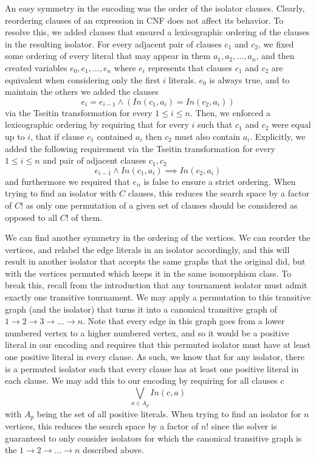 \documentclass[a4paper,UKenglish,cleveref, autoref, thm-restate]{lipics-v2021}
\begin{document}
An easy symmetry in the encoding was the order of the isolator clauses.  Clearly, reordering clauses of an expression in CNF does not affect its behavior.  To resolve this, we added clauses that ensured a lexicographic ordering of the clauses in the resulting isolator.  For every adjacent pair of clauses $c_1$ and $c_2$, we fixed some ordering of every literal that may appear in them $a_1, a_2, \dots, a_n$, and then created variables $e_0, e_1, \dots, e_n$ where $e_i$ represents that clauses $c_1$ and $c_2$ are equivalent when considering only the first $i$ literals.  $e_0$ is always true, and to maintain the others we added the clauses
$$e_i = e_{i-1} \land (In(c_1, a_i) = In(c_2, a_i))$$
via the Tseitin transformation for every $1 \le i \le n$.  Then, we enforced a lexicographic ordering by requiring that for every $i$ such that $c_1$ and $c_2$ were equal up to $i$, that if clause $c_1$ contained $a_i$ then $c_2$ must also contain $a_i$.  Explicitly, we added the following requirement via the Tseitin transformation for every $1 \le i \le n$ and pair of adjacent clauses $c_1, c_2$
$$e_{i-1} \land In(c_1, a_i) \implies In(c_2, a_i)$$
and furthermore we required that $e_n$ is false to ensure a strict ordering.  When trying to find an isolator with $C$ clauses, this reduces the search space by a factor of $C!$ as only one permutation of a given set of clauses should be considered as opposed to all $C!$ of them.

We can find another symmetry in the ordering of the vertices.  We can reorder the vertices, and relabel the edge literals in an isolator accordingly, and this will result in another isolator that accepts the same graphs that the original did, but with the vertices permuted which keeps it in the same isomorphism class.  To break this, recall from the introduction that any tournament isolator must admit exactly one transitive tournament.  We may apply a permutation to this transitive graph (and the isolator) that turns it into a canonical transitive graph of $1 \to 2 \to 3 \to \dots \to n$.  Note that every edge in this graph goes from a lower numbered vertex to a higher numbered vertex, and so it would be a positive literal in our encoding and requires that this permuted isolator must have at least one positive literal in every clause.  As such, we know that for any isolator, there is a permuted isolator such that every clause has at least one positive literal in each clause.  We may add this to our encoding by requiring for all clauses $c$
$$\bigvee_{a \in A_p} In(c, a)$$
with $A_p$ being the set of all positive literals.    When trying to find an isolator for $n$ vertices, this reduces the search space by a factor of $n!$ since the solver is guaranteed to only consider isolators for which the canonical transitive graph is the $1 \to 2 \to \dots \to n$ described above.
\end{document}
